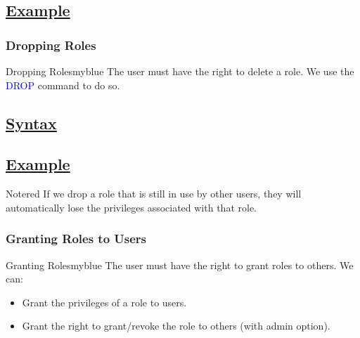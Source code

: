 \vspace{0.15cm}
\subsection*{\underline{Example}}


\vspace{0.25cm}
\subsubsection{Dropping Roles} 
\begin{prettyBox}{Dropping Roles}{myblue}
The user must have the right to delete a role. We use the 
\textcolor{blue}{DROP} command to do so.
\end{prettyBox}

\vspace{0.15cm}
\subsection*{\underline{Syntax}}


\vspace{0.15cm}
\subsection*{\underline{Example}}


\vspace{0.15cm}
\begin{prettyBox}{Note}{red} 
If we drop a role that is still in use by other users, they will automatically
lose the privileges associated with that role.
\end{prettyBox}

\vspace{0.25cm}
\subsubsection{Granting Roles to Users}
\begin{prettyBox}{Granting Roles}{myblue} The user must have the right to 
grant roles to others. We can:
\begin{itemize} 
\item Grant the privileges of a role to users. 
\item Grant the right to grant/revoke the role to others (with admin option).
\end{itemize} 
\end{prettyBox}

